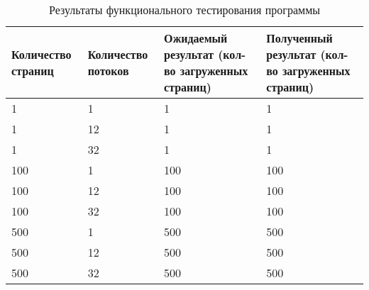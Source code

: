 \begin{table}[ht]
    \small
    \begin{center}
        \begin{threeparttable}
            \caption{Результаты функционального тестирования программы}
            \label{tbl:test}
            \begin{tabular}{|p{3cm}|p{3cm}|p{4cm}|p{4cm}|}
                \hline
                \textbf{Количество страниц} & \textbf{Количество потоков} & \textbf{Ожидаемый результат (кол-во загруженных страниц)} & \textbf{Полученный результат (кол-во загруженных страниц)}  \\
                \hline
                1 & 1  & 1 & 1 \\
                \hline
                1  & 12 & 1 & 1  \\
                \hline
                1  & 32 & 1 & 1  \\
                \hline
                100  & 1 & 100 & 100 \\
                \hline
                100  & 12 & 100 & 100 \\
                \hline
                100  & 32 & 100 & 100 \\
                \hline
                500  & 1  & 500 & 500 \\
                \hline
                500  & 12 & 500 & 500 \\
                \hline
                500  & 32 & 500 & 500 \\
                \hline
            \end{tabular}
        \end{threeparttable}
    \end{center}
\end{table}
